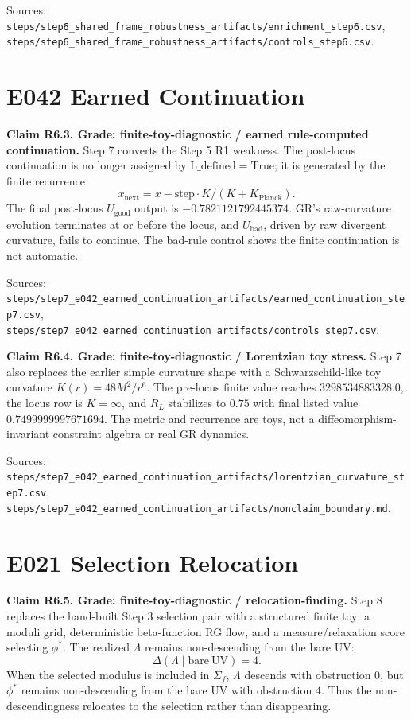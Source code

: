 \documentclass[11pt]{article}
\begin{document}
Sources: \texttt{steps/step6\_shared\_frame\_robustness\_artifacts/enrichment\_step6.csv}, \texttt{steps/step6\_shared\_frame\_robustness\_artifacts/controls\_step6.csv}.

\section{E042 Earned Continuation}

\textbf{Claim R6.3. Grade: finite-toy-diagnostic / earned rule-computed continuation.}
Step 7 converts the Step 5 R1 weakness. The post-locus continuation is no longer assigned by \(\mathrm{L\_defined=True}\); it is generated by the finite recurrence
\[
x_{\mathrm{next}}=x-\mathrm{step}\cdot K/(K+K_{\mathrm{Planck}}).
\]
The final post-locus \(U_{\mathrm{good}}\) output is \(-0.7821121792445374\). GR's raw-curvature evolution terminates at or before the locus, and \(U_{\mathrm{bad}}\), driven by raw divergent curvature, fails to continue. The bad-rule control shows the finite continuation is not automatic.

Sources: \texttt{steps/step7\_e042\_earned\_continuation\_artifacts/earned\_continuation\_step7.csv}, \texttt{steps/step7\_e042\_earned\_continuation\_artifacts/controls\_step7.csv}.

\textbf{Claim R6.4. Grade: finite-toy-diagnostic / Lorentzian toy stress.}
Step 7 also replaces the earlier simple curvature shape with a Schwarzschild-like toy curvature \(K(r)=48M^2/r^6\). The pre-locus finite value reaches \(3298534883328.0\), the locus row is \(K=\infty\), and \(R_L\) stabilizes to \(0.75\) with final listed value \(0.7499999997671694\). The metric and recurrence are toys, not a diffeomorphism-invariant constraint algebra or real GR dynamics.

Sources: \texttt{steps/step7\_e042\_earned\_continuation\_artifacts/lorentzian\_curvature\_step7.csv}, \texttt{steps/step7\_e042\_earned\_continuation\_artifacts/nonclaim\_boundary.md}.

\section{E021 Selection Relocation}

\textbf{Claim R6.5. Grade: finite-toy-diagnostic / relocation-finding.}
Step 8 replaces the hand-built Step 3 selection pair with a structured finite toy: a moduli grid, deterministic beta-function RG flow, and a measure/relaxation score selecting \(\phi^\ast\). The realized \(\Lambda\) remains non-descending from the bare UV:
\[
\Delta(\Lambda\mid \mathrm{bare\ UV})=4.
\]
When the selected modulus is included in \(\Sigma_f\), \(\Lambda\) descends with obstruction \(0\), but \(\phi^\ast\) remains non-descending from the bare UV with obstruction \(4\). Thus the non-descendingness relocates to the selection rather than disappearing.
\end{document}
